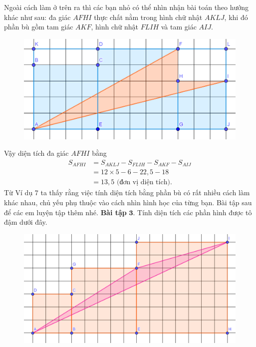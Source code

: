 \begin{multicols}{2}
	\vskip 0.1cm
	Ngoài cách làm ở trên ra thì các bạn nhỏ có thể nhìn nhận bài toán theo hướng khác như sau:  đa giác $AFHI$ thực chất nằm trong hình chữ nhật $AKLJ$, khi đó phần bù gồm tam giác $AKF$, hình chữ nhật $FLIH$ và tam giác $AIJ$. 
	\begin{figure}[H]
		\centering
		\captionsetup{labelformat= empty, justification=centering}
		\includegraphics[width=1\linewidth]{19}
		\vspace*{-15pt}
	\end{figure}
	Vậy diện tích đa giác $AFHI$ bằng 
	\begin{align*}
		S_{AFHI}&=S_{AKLJ}-S_{FLIH}-S_{AKF}-S_{AIJ}\\ 
		&=12\times5-6-22{,}5-18\\
		&=13{,}5 \text{ (đơn vị diện tích)}.
	\end{align*}
	Từ Ví dụ $7$ ta thấy rằng việc tính diện tích bằng phần bù có rất nhiều cách làm khác nhau, chủ yếu phụ thuộc vào cách nhìn hình học của từng bạn.   
	\vskip 0.1cm
	Bài tập sau để các em luyện tập thêm nhé.
	\vskip 0.1cm
	\textbf{\color{toancuabi}Bài tập} $\pmb{3.}$ Tính diện tích các phần hình được tô đậm dưới đây.
		\begin{figure}[H]
		\centering
		\vspace*{-5pt}
		\captionsetup{labelformat= empty, justification=centering}
		\includegraphics[width=1\linewidth]{20}

\end{figure}
\end{multicols}
